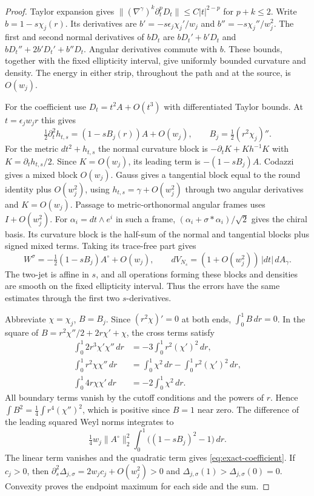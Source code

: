 \documentclass[11pt,letterpaper]{article}
\numberwithin{equation}{section}
\newcommand{\rd}{\gamma}
\begin{document}
\begin{proof}
Taylor expansion gives
\(\|(\nabla^\rd)^k\partial_t^p D_t\|\le C|t|^{2-p}\) for
\(p+k\le2\). Write \(b=1-s\chi_j(r)\). Its derivatives are
\(b'=-s\epsilon_j\chi_j'/w_j\) and \(b''=-s\chi_j''/w_j^2\).
The first and second normal derivatives of \(bD_t\) are
\(bD_t'+b'D_t\) and \(bD_t''+2b'D_t'+b''D_t\).
Angular derivatives commute with \(b\). These bounds, together
with the fixed ellipticity interval, give uniformly bounded
curvature and density. The energy in either strip, throughout the
path and at the source, is \(O(w_j)\).

For the coefficient use \(D_t=t^2A+O(t^3)\) with differentiated
Taylor bounds. At \(t=\epsilon_jw_jr\) this gives
\[
 \tfrac12\partial_t^2h_{t,s}=(1-sB_j(r))A+O(w_j),
 \qquad B_j=\tfrac12(r^2\chi_j)''.
\]
For the metric \(dt^2+h_{t,s}\) the normal curvature block is
\(-\partial_t K+Kh^{-1}K\) with \(K=\partial_t h_{t,s}/2\).
Since \(K=O(w_j)\), its leading term is \(-(1-sB_j)A\).
Codazzi gives a mixed block \(O(w_j)\). Gauss gives a tangential
block equal to the round identity plus \(O(w_j^2)\), using
\(h_{t,s}=\rd+O(w_j^2)\) through two angular derivatives and
\(K=O(w_j)\). Passage to metric-orthonormal angular frames
uses \(I+O(w_j^2)\). For \(\alpha_i=dt\wedge e^i\) in such
a frame, \((\alpha_i+\sigma*\alpha_i)/\sqrt2\) gives the
chiral basis. Its curvature block is the half-sum of the
normal and tangential blocks plus signed mixed terms. Taking
its trace-free part gives
\[
 W^\sigma=-\tfrac12(1-sB_j)A^\circ+O(w_j),\qquad
 dV_{N_s}=(1+O(w_j^2))\,|dt|\,dA_\rd .
\]
The two-jet is affine in \(s\), and all operations forming these
blocks and densities are smooth on the fixed ellipticity interval.
Thus the errors have the same estimates through the first two
\(s\)-derivatives.

Abbreviate \(\chi=\chi_j\), \(B=B_j\). Since
\((r^2\chi)'=0\) at both ends, \(\int_0^1B\,dr=0\).
In the square of \(B=r^2\chi''/2+2r\chi'+\chi\), the cross
terms satisfy
\[
 \begin{aligned}
 \int_0^1 2r^3\chi'\chi''\,dr&=-3\int_0^1r^2(\chi')^2\,dr,\\
 \int_0^1 r^2\chi\chi''\,dr
     &=\int_0^1\chi^2\,dr-\int_0^1r^2(\chi')^2\,dr,\\
 \int_0^1 4r\chi\chi'\,dr&=-2\int_0^1\chi^2\,dr .
 \end{aligned}
\]
All boundary terms vanish by the cutoff conditions and the
powers of \(r\). Hence \(\int B^2=\frac14\int r^4(\chi'')^2\),
which is positive since \(B=1\) near zero. The difference of
the leading squared Weyl norms integrates to
\[
 \tfrac14w_j\|A^\circ\|_2^2
       \int_0^1\bigl((1-sB_j)^2-1\bigr)\,dr .
\]
The linear term vanishes and the quadratic term gives
\eqref{eq:exact-coefficient}. If \(c_j>0\), then
\(\partial_s^2\Delta_{j,\sigma}=2w_jc_j+O(w_j^2)>0\)
and \(\Delta_{j,\sigma}(1)>\Delta_{j,\sigma}(0)=0\).
Convexity proves the endpoint maximum for each side and the sum.
\end{proof}
\end{document}

